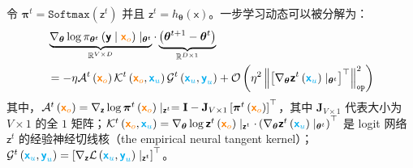 \documentclass[citestyle=gb7714-2015, bibstyle=gb7714-2015,lang=cn,14pt,scheme=chinese]{elegantbook}
\begin{document}
\begin{proposition}\label{prop:one_step_dynamics_decompose}
令 \(\bm{\pi}^{t} = \mathtt{Softmax} \left( \bm{\mathsf{z}}^{t} \right)\) 并且 \(\bm{\mathsf{z}}^{t} = h_{\bm{\theta}} \left( \bm{\mathsf{x}} \right)\)。一步学习动态可以被分解为：
\begin{equation}\label{eq:SGD-decomposition}
\begin{aligned}
    &\underbrace{\nabla_{\bm{\theta}} \log \pi_{\bm{\theta}^{t}} \left( \bm{\mathsf{y}} \mid \textcolor{orange}{\bm{\mathsf{x}}_{o}} \right) \mid_{\bm{\theta}^{t}}}_{\mathbb{R}^{V \times D}} \cdot \underbrace{\left( \bm{\theta}^{t+1} - \bm{\theta}^{t} \right)}_{\mathbb{R}^{D \times 1}} \\
    &= - \eta \mathcal{A}^{t} \left( \textcolor{orange}{\bm{\mathsf{x}}_{o}} \right) \mathcal{K}^{t} \left( \textcolor{orange}{\bm{\mathsf{x}}_{o}}, \textcolor{cyan}{\bm{\mathsf{x}}_{u}} \right) \mathcal{G}^{t} \left( \textcolor{cyan}{\bm{\mathsf{x}}_{u}}, \textcolor{cyan}{\bm{\mathsf{y}}_{u}} \right) + \mathcal{O} \left( \eta^{2} \left\| \left[ \nabla_{\bm{\theta}} \bm{\mathsf{z}}^{t} \left( \textcolor{cyan}{\bm{\mathsf{x}}_{u}} \right) \mid_{\bm{\theta}^{t}}  \right]^{\top} \right\|^{2}_{\texttt{op}} \right)
\end{aligned}
\end{equation}
其中，\( \mathcal{A}^{t} \left( \textcolor{orange}{\bm{\mathsf{x}}_{o}} \right) = \nabla_{\bm{\mathsf{z}}} \log \bm{\pi}^{t} \left( \textcolor{orange}{\bm{\mathsf{x}}_{o}} \right) \mid_{\bm{\mathsf{z}}^{t}} = \mathbf{I} - \mathbf{J}_{V \times 1} \left[ \bm{\pi}^{t} \left( \textcolor{orange}{\bm{\mathsf{x}}_{o}} \right) \right]^{\top} \)，其中 \(\mathbf{J}_{V \times 1}\) 代表大小为 \(V \times 1\) 的全 \(1\) 矩阵；\(\mathcal{K}^{t} \left( \textcolor{orange}{\bm{\mathsf{x}}_{o}}, \textcolor{cyan}{\bm{\mathsf{x}}_{u}} \right) = \nabla_{\bm{\theta}} \log \bm{\mathsf{z}}^{t} \left( \textcolor{orange}{\bm{\mathsf{x}}_{o}} \right) \mid_{\bm{\mathsf{z}}^{t}} \cdot \left( \nabla_{\bm{\theta}} \bm{\mathsf{z}}^{t} \left( \textcolor{cyan}{\bm{\mathsf{x}}_{u}} \right) \mid_{\bm{\theta}^{t}} \right)^{\top}\) 是 logit 网络 \(\bm{\mathsf{z}}^{t}\) 的经验神经切线核（the empirical  neural tangent kernel）；\(\mathcal{G}^{t} \left( \textcolor{cyan}{\bm{\mathsf{x}}_{u}}, \textcolor{cyan}{\bm{\mathsf{y}}_{u}} \right) = \left[ \nabla_{\bm{\mathsf{z}}} \mathcal{L} \left( \textcolor{cyan}{\bm{\mathsf{x}}_{u}}, \textcolor{cyan}{\bm{\mathsf{y}}_{u}} \right) \mid_{\bm{\mathsf{z}}^{t}} \right]^{\top}\)。
\end{proposition}
\end{document}
